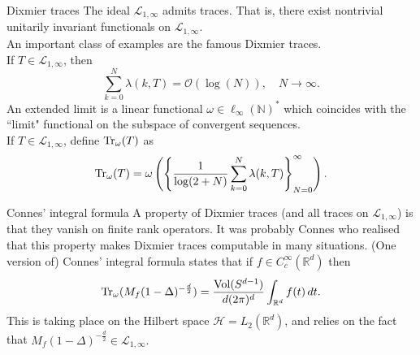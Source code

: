 \documentclass{beamer}
\numberwithin{equation}{section}
\theoremstyle{plain}
\theoremstyle{plain}
\theoremstyle{definition}
\theoremstyle{plain}
\theoremstyle{plain}
\theoremstyle{definition}
\newcommand{\tr}{{\rm Tr}}
\newcommand{\Vol}{\mathrm{Vol}}
\newcommand{\Rl}{\mathbb{R}}
\begin{document}
\begin{frame}{Dixmier traces}
    The ideal $\mathcal{L}_{1,\infty}$ admits traces. That is, there exist nontrivial unitarily invariant functionals on $\mathcal{L}_{1,\infty}$.\\
    \pause
    An important class of examples are the famous Dixmier traces.\\
    If $T \in \mathcal{L}_{1,\infty}$, then
    \begin{equation*}
        \sum_{k=0}^N \lambda(k,T) = \mathcal{O}(\log(N)),\quad N\to\infty.
    \end{equation*}
    \pause
    An extended limit is a linear functional $\omega \in \ell_{\infty}(\mathbb{N})^*$
    which coincides with the ``limit" functional on the subspace of convergent sequences.\\
    If $T \in \mathcal{L}_{1,\infty}$, define $\tr_{\omega}(T)$
    as
    $$
        \tr_\omega(T) = \omega\left(\left\{\frac{1}{\log(2+N)}\sum_{k=0}^N \lambda(k,T)\right\}_{N=0}^\infty\right).
    $$
\end{frame}



\begin{frame}{Connes' integral formula}
    A property of Dixmier traces (and all traces on $\mathcal{L}_{1,\infty}$) is that they vanish on finite rank operators.
    \pause
    It was probably Connes who realised that this property makes Dixmier traces computable in many situations. (One version of) Connes' integral formula states that
    if $f \in C^\infty_c(\Rl^d)$ then
    $$
        \tr_{\omega}(M_f(1-\Delta)^{-\frac{d}{2}}) = \frac{\Vol(S^{d-1})}{d(2\pi)^d}\int_{\Rl^d} f(t)\,dt.
    $$     
    This is taking place on the Hilbert space $\mathcal{H} = L_2(\Rl^d)$, and relies on the fact that $M_f(1-\Delta)^{-\frac{d}{2}} \in \mathcal{L}_{1,\infty}.$
\end{frame}
\end{document}

